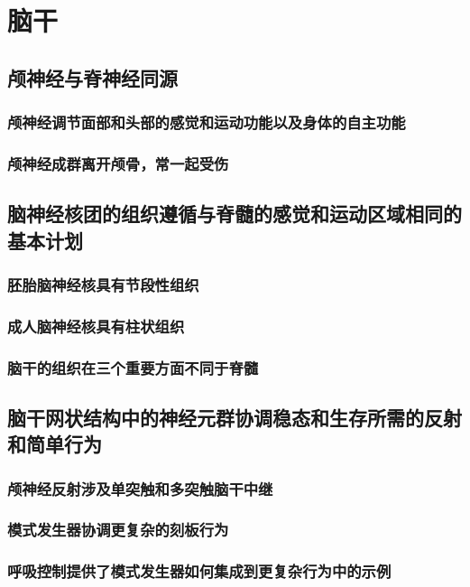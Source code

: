 \chapter{脑干}

\section{颅神经与脊神经同源}
\subsection{颅神经调节面部和头部的感觉和运动功能以及身体的自主功能}
\subsection{颅神经成群离开颅骨，常一起受伤}

\section{脑神经核团的组织遵循与脊髓的感觉和运动区域相同的基本计划}
\subsection{胚胎脑神经核具有节段性组织}
\subsection{成人脑神经核具有柱状组织}
\subsection{脑干的组织在三个重要方面不同于脊髓}

\section{脑干网状结构中的神经元群协调稳态和生存所需的反射和简单行为}
\subsection{颅神经反射涉及单突触和多突触脑干中继}
\subsection{模式发生器协调更复杂的刻板行为}
\subsection{呼吸控制提供了模式发生器如何集成到更复杂行为中的示例}

